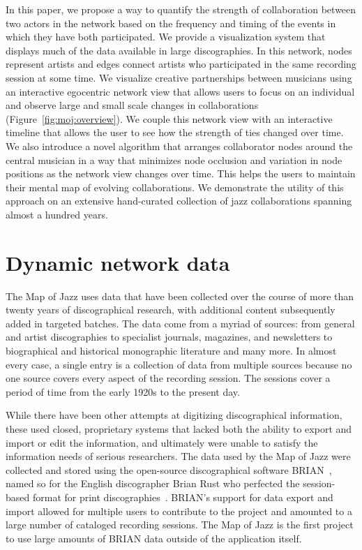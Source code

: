 \documentclass[12pt]{cmuthesis}
\begin{document}
  In this paper, we propose a way to quantify the strength of collaboration between two actors in the network based on the frequency and timing of the events in which they have both participated. We provide a visualization system that displays much of the data available in large discographies. In this network, nodes represent artists and edges connect artists who participated in the same recording session at some time. We visualize creative partnerships between musicians using an interactive egocentric network view that allows users to focus on an individual and observe large and small scale changes in collaborations (Figure~\ref{fig:moj:overview}). We couple this network view with an interactive timeline that allows the user to see how the strength of ties changed over time. We also introduce a novel algorithm that arranges collaborator nodes around the central musician in a way that minimizes node occlusion and variation in node positions as the network view changes over time. This helps the users to maintain their mental map of evolving collaborations. We demonstrate the utility of this approach on an extensive hand-curated collection of jazz collaborations spanning almost a hundred years.

\section{Dynamic network data}


  The Map of Jazz uses data that have been collected over the course of more than twenty years of discographical research, with additional content subsequently added in targeted batches. The data come from a myriad of sources: from general and artist discographies to specialist journals, magazines, and newsletters to biographical and historical monographic literature and many more. In almost every case, a single entry is a collection of data from multiple sources because no one source covers every aspect of the recording session. The sessions cover a period of time from the early 1920s to the present day.

  While there have been other attempts at digitizing discographical information, these used closed, proprietary systems that lacked both the ability to export and import or edit the information, and ultimately were unable to satisfy the information needs of serious researchers. The data used by the Map of Jazz were collected and stored using the open-source discographical software BRIAN~\cite{Albin}, named so for the English discographer Brian Rust who perfected the session-based format for print discographies~\cite{Rust1980,Rust2002}. BRIAN's support for data export and import allowed for multiple users to contribute to the project and amounted to a large number of cataloged recording sessions. The Map of Jazz is the first project to use large amounts of BRIAN data outside of the application itself.
\end{document}
